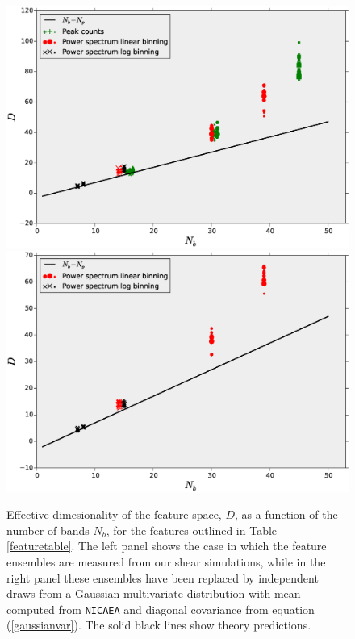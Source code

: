 \documentclass[reprint,aps,prd,superscriptaddress,showkeys,showpacs]{revtex4-1}
\begin{document}
\begin{figure}
\includegraphics[scale=0.3]{Figures/effective_nb.eps}
\includegraphics[scale=0.3]{Figures/effective_nb_gaussian.eps}
\caption{Effective dimesionality of the feature space, $D$, as a function of the number of bands $N_b$, for the features outlined in Table \ref{featuretable}. The left panel shows the case in which the feature ensembles are measured from our shear simulations, while in the right panel these ensembles have been replaced by independent draws from a Gaussian multivariate distribution with mean computed from \texttt{NICAEA} and diagonal covariance from equation (\ref{gaussianvar}). The solid black lines show theory predictions.}
\label{effectivenb}
\end{figure}

\end{document}
